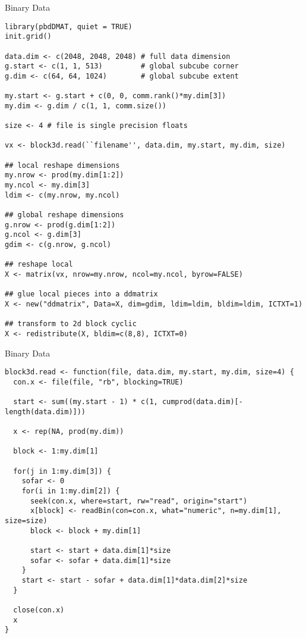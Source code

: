 \begin{frame}
  \begin{exampleblock}{Binary Data}\pause
    \begin{lstlisting}[title=Read subcube, reshape to ddmatrix, make
      block cyclic]
library(pbdDMAT, quiet = TRUE)
init.grid()

data.dim <- c(2048, 2048, 2048) # full data dimension
g.start <- c(1, 1, 513)         # global subcube corner
g.dim <- c(64, 64, 1024)        # global subcube extent

my.start <- g.start + c(0, 0, comm.rank()*my.dim[3])
my.dim <- g.dim / c(1, 1, comm.size())

size <- 4 # file is single precision floats

vx <- block3d.read(``filename'', data.dim, my.start, my.dim, size)

## local reshape dimensions
my.nrow <- prod(my.dim[1:2])
my.ncol <- my.dim[3]
ldim <- c(my.nrow, my.ncol)

## global reshape dimensions
g.nrow <- prod(g.dim[1:2])
g.ncol <- g.dim[3]
gdim <- c(g.nrow, g.ncol)

## reshape local
X <- matrix(vx, nrow=my.nrow, ncol=my.ncol, byrow=FALSE)

## glue local pieces into a ddmatrix
X <- new("ddmatrix", Data=X, dim=gdim, ldim=ldim, bldim=ldim, ICTXT=1)

## transform to 2d block cyclic
X <- redistribute(X, bldim=c(8,8), ICTXT=0)
    \end{lstlisting}
  \end{exampleblock}
\end{frame}

\begin{frame}
  \begin{exampleblock}{Binary Data}\pause
    \begin{lstlisting}[title=3d Block Binary Reader]
block3d.read <- function(file, data.dim, my.start, my.dim, size=4) {
  con.x <- file(file, "rb", blocking=TRUE)

  start <- sum((my.start - 1) * c(1, cumprod(data.dim)[-length(data.dim)]))

  x <- rep(NA, prod(my.dim))
        
  block <- 1:my.dim[1]
        
  for(j in 1:my.dim[3]) {
    sofar <- 0
    for(i in 1:my.dim[2]) {
      seek(con.x, where=start, rw="read", origin="start")
      x[block] <- readBin(con=con.x, what="numeric", n=my.dim[1], size=size)
      block <- block + my.dim[1]

      start <- start + data.dim[1]*size
      sofar <- sofar + data.dim[1]*size
    }
    start <- start - sofar + data.dim[1]*data.dim[2]*size
  }

  close(con.x)
  x
}
    \end{lstlisting}
  \end{exampleblock}
\end{frame}
